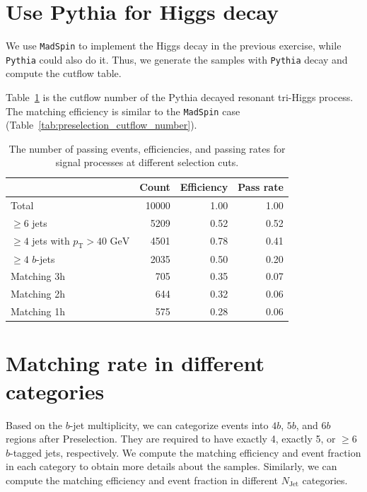 \documentclass[12pt]{article}
\begin{document}
\section{Use Pythia for Higgs decay}%
\label{sec:use_pythia_for_higgs_decay}
    We use \verb|MadSpin| to implement the Higgs decay in the previous exercise, while \verb|Pythia| could also do it. Thus, we generate the samples with \verb|Pythia| decay and compute the cutflow table.

    Table~\ref{tab:preselection_cutflow_number_pythia_decay} is the cutflow number of the Pythia decayed resonant tri-Higgs process. The matching efficiency is similar to the \verb|MadSpin| case (Table~\ref{tab:preselection_cutflow_number}).
    \begin{table}[htpb]
        \centering
        \caption{The number of passing events, efficiencies, and passing rates for signal processes at different selection cuts.}
        \label{tab:preselection_cutflow_number_pythia_decay}
        \begin{tabular}{l|rrr}
                                                         & Count  & Efficiency & Pass rate \\ \hline
        Total                                            & 10000 & 1.00       & 1.00      \\
        $\ge 6$ jets                                     & 5209  & 0.52       & 0.52      \\
        $\ge 4$ jets with $p_{\text{T}} > \text{40 GeV}$ & 4501  & 0.78       & 0.41      \\
        $\ge 4$ $b$-jets                                 & 2035  & 0.50       & 0.20      \\ \hline
        Matching 3h                                      & 705   & 0.35       & 0.07      \\
        Matching 2h                                      & 644   & 0.32       & 0.06      \\
        Matching 1h                                      & 575   & 0.28       & 0.06      \\
        \end{tabular}
    \end{table}
\section{Matching rate in different categories}%
\label{sec:matching_rate_in_different_categories}
    Based on the $b$-jet multiplicity, we can categorize events into $4b$,  $5b$, and $6b$ regions after Preselection. They are required to have exactly 4, exactly 5, or $\ge 6$ $b$-tagged jets, respectively. We compute the matching efficiency and event fraction in each category to obtain more details about the samples. Similarly, we can compute the matching efficiency and event fraction in different $N_{\text{Jet}}$ categories.
\end{document}
